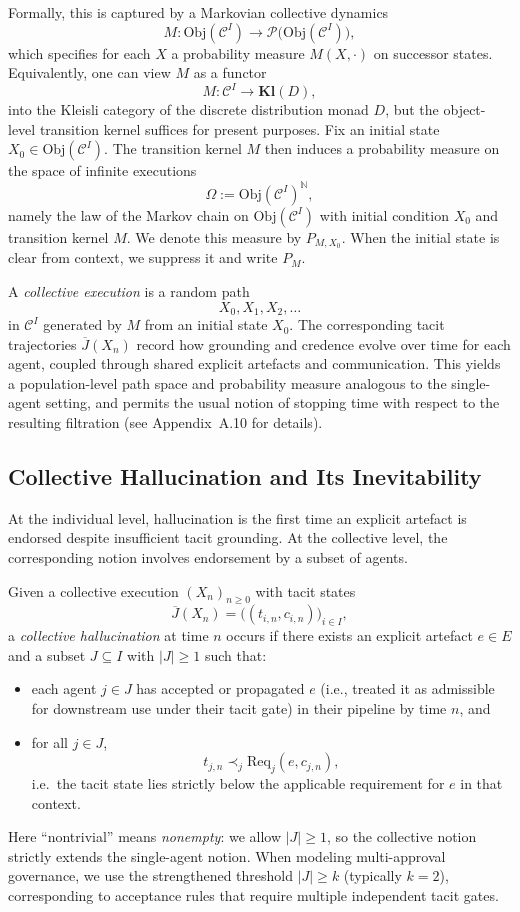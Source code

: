 Formally, this is captured by a Markovian collective dynamics
\[
  M : \mathrm{Obj}(\mathcal{C}^I)
    \longrightarrow \mathcal{P}\bigl( \mathrm{Obj}(\mathcal{C}^I) \bigr),
\]
which specifies for each $X$ a probability measure $M(X,\cdot)$ on successor states. Equivalently, one can view $M$ as a functor
\[
  M : \mathcal{C}^I \longrightarrow \mathbf{Kl}(D),
\]
into the Kleisli category of the discrete distribution monad $D$, but the object-level transition kernel suffices for present purposes.
Fix an initial state $X_0\in \mathrm{Obj}(\mathcal{C}^I)$. The transition kernel $M$ then induces a
probability measure on the space of infinite executions
\[
  \Omega := \mathrm{Obj}(\mathcal{C}^I)^{\mathbb{N}},
\]
namely the law of the Markov chain on $\mathrm{Obj}(\mathcal{C}^I)$ with initial condition $X_0$ and
transition kernel $M$. We denote this measure by $P_{M,X_0}$. When the initial state is clear from
context, we suppress it and write $P_M$.


A \emph{collective execution} is a random path
\[
  X_0, X_1, X_2, \dots
\]
in $\mathcal{C}^I$ generated by $M$ from an initial state $X_0$. The corresponding tacit trajectories $\overline{J}(X_n)$ record how grounding and credence evolve over time for each agent, coupled through shared explicit artefacts and communication. This yields a population-level path space and probability measure analogous to the single-agent setting, and permits the usual notion of stopping time with respect to the resulting filtration (see Appendix~A.10 for details).

\subsection{Collective Hallucination and Its Inevitability}

At the individual level, hallucination is the first time an explicit artefact is endorsed despite insufficient tacit grounding. At the collective level, the corresponding notion involves endorsement by a subset of agents.

Given a collective execution $(X_n)_{n\ge 0}$ with tacit states
\[
  \overline{J}(X_n) = \bigl((t_{i,n},c_{i,n})\bigr)_{i\in I},
\]
a \emph{collective hallucination} at time $n$ occurs if there exists an explicit artefact $e \in E$ and a subset $J \subseteq I$ with $|J|\ge 1$ such that:
\begin{itemize}
  \item each agent $j \in J$ has accepted or propagated $e$ (i.e., treated it as admissible for downstream use under their tacit gate) in their pipeline by time $n$, and
  \item for all $j \in J$,
        \[
          t_{j,n} \prec_j \mathrm{Req}_j(e,c_{j,n}),
        \]
        i.e.\ the tacit state lies strictly below the applicable requirement for $e$ in that context.
\end{itemize}
Here ``nontrivial'' means \emph{nonempty}: we allow $|J|\ge 1$, so the collective notion strictly extends the single-agent notion. When modeling multi-approval governance, we use the strengthened threshold $|J|\ge k$ (typically $k=2$), corresponding to acceptance rules that require multiple independent tacit gates.


